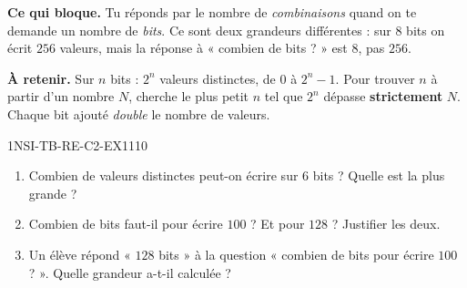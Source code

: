 

\textbf{Ce qui bloque.} Tu réponds par le nombre de \emph{combinaisons} quand on te demande un
nombre de \emph{bits}. Ce sont deux grandeurs différentes : sur $8$ bits on écrit $256$ valeurs,
mais la réponse à « combien de bits ? » est $8$, pas $256$.

\textbf{À retenir.} Sur $n$ bits : $2^n$ valeurs distinctes, de $0$ à $2^n-1$. Pour trouver
$n$ à partir d'un nombre $N$, cherche le plus petit $n$ tel que $2^n$ dépasse
\textbf{strictement} $N$. Chaque bit ajouté \emph{double} le nombre de valeurs.

\begin{exercice}{1NSI-TB-RE-C2-EX1}{1}{10}
\begin{enumerate}
  \item Combien de valeurs distinctes peut-on écrire sur $6$ bits ? Quelle est la plus grande ?
  \item Combien de bits faut-il pour écrire $100$ ? Et pour $128$ ? Justifier les deux.
  \item Un élève répond « $128$ bits » à la question « combien de bits pour écrire $100$ ? ».
        Quelle grandeur a-t-il calculée ?
\end{enumerate}
\end{exercice}

